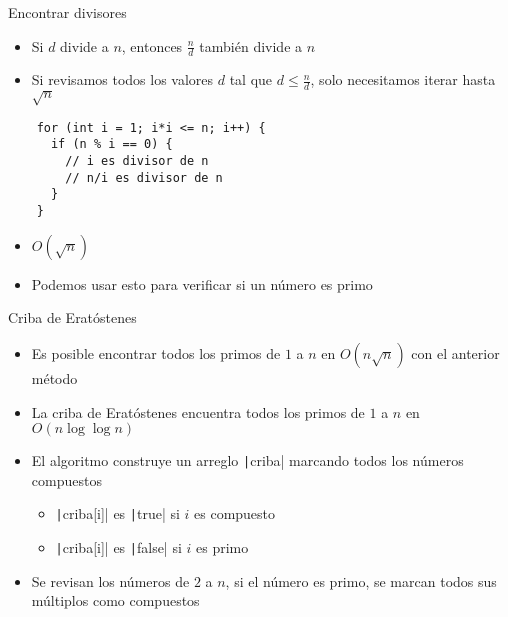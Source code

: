 \documentclass[10pt]{beamer}
\newcommand{\bi}{\begin{itemize}}
\newcommand{\ei}{\end{itemize}}
\begin{document}
\begin{frame}[fragile]{Encontrar divisores}
  \bi
    \item Si $d$ divide a $n$, entonces $\frac{n}{d}$ también divide a $n$
    \item Si revisamos todos los valores $d$ tal que $d \leq \frac{n}{d}$, solo necesitamos iterar hasta $\sqrt{n}$
  \ei
  \begin{verbatim}
    for (int i = 1; i*i <= n; i++) {
      if (n % i == 0) {
        // i es divisor de n
        // n/i es divisor de n
      }
    }
  \end{verbatim}
  \bi
    \item $O(\sqrt{n})$
    \item<2-> Podemos usar esto para verificar si un número es primo
  \ei
\end{frame}

\begin{frame}{Criba de Eratóstenes}
  \bi
    \item Es posible encontrar todos los primos de $1$ a $n$ en $O(n \sqrt{n})$ con el anterior método
    \item La criba de Eratóstenes encuentra todos los primos de $1$ a $n$ en $O(n \log \log n)$
    
    \vspace{20pt}

    \item<2-> El algoritmo construye un arreglo \texttt|criba| marcando todos los números compuestos
    \bi
      \item<2-> \texttt|criba[i]| es \texttt|true| si $i$ es compuesto
      \item<2-> \texttt|criba[i]| es \texttt|false| si $i$ es primo
    \ei
    \item<3-> Se revisan los números de $2$ a $n$, si el número es primo, se marcan todos sus múltiplos como compuestos
  \ei
\end{frame}
\end{document}
